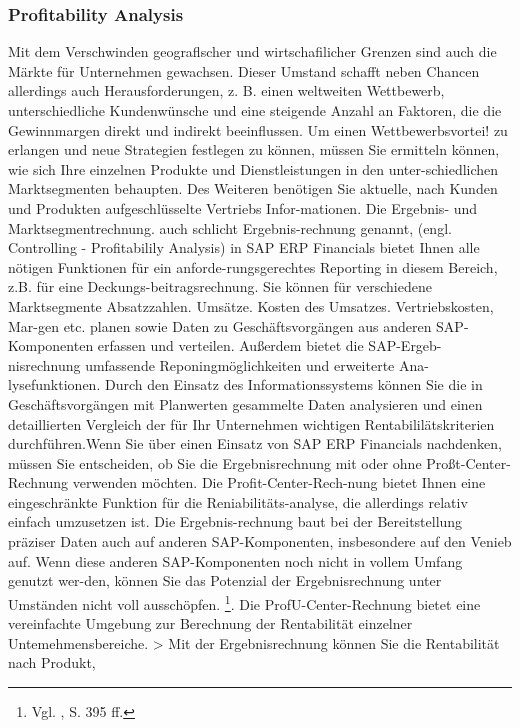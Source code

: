 \subsubsection{Profitability Analysis} %
Mit dem Verschwinden geograflscher und wirtschafilicher Grenzen
sind auch die Märkte für Unternehmen gewachsen. Dieser Umstand
schafft neben Chancen allerdings auch Herausforderungen, z. B. einen
weltweiten Wettbewerb, unterschiedliche Kundenwünsche und eine
steigende Anzahl an Faktoren, die die Gewinnmargen direkt und
indirekt beeinflussen. Um einen Wettbewerbsvortei! zu erlangen und
neue Strategien festlegen zu können, müssen Sie ermitteln können,
wie sich Ihre einzelnen Produkte und Dienstleistungen in den unter-schiedlichen Marktsegmenten behaupten. Des Weiteren benötigen Sie
aktuelle, nach Kunden und Produkten aufgeschlüsselte Vertriebs Infor-mationen. Die Ergebnis- und Marktsegmentrechnung. auch schlicht Ergebnis-rechnung genannt, (engl. Controlling - Profitabilily Analysis) in SAP
ERP Financials bietet Ihnen alle nötigen Funktionen für ein anforde-rungsgerechtes Reporting in diesem Bereich, z.B. für eine Deckungs-beitragsrechnung. Sie können für verschiedene Marktsegmente
Absatzzahlen. Umsätze. Kosten des Umsatzes. Vertriebskosten, Mar-gen etc. planen sowie Daten zu Geschäftsvorgängen aus anderen SAP-Komponenten erfassen und verteilen. Außerdem bietet die SAP-Ergeb-nisrechnung umfassende Reponingmöglichkeiten und erweiterte Ana-lysefunktionen. Durch den Einsatz des Informationssystems können Sie die in
Geschäftsvorgängen mit Planwerten gesammelte Daten analysieren
und einen detaillierten Vergleich der für Ihr Unternehmen wichtigen
Rentabililätskriterien durchführen.Wenn Sie über einen Einsatz von SAP ERP Financials nachdenken,
müssen Sie entscheiden, ob Sie die Ergebnisrechnung mit oder ohne
Proßt-Center-Rechnung verwenden möchten. Die Profit-Center-Rech-nung bietet Ihnen eine eingeschränkte Funktion für die Reniabilitäts-analyse, die allerdings relativ einfach umzusetzen ist. Die Ergebnis-rechnung baut bei der Bereitstellung präziser Daten auch auf anderen
SAP-Komponenten, insbesondere auf den Venieb auf. Wenn diese
anderen SAP-Komponenten noch nicht in vollem Umfang genutzt wer-den, können Sie das Potenzial der Ergebnisrechnung unter Umständen
nicht voll ausschöpfen. \footnote{Vgl. \cite{Patel2009}, S. 395 ff.}. 
Die ProfU-Center-Rechnung bietet eine vereinfachte Umgebung zur
Berechnung der Rentabilität einzelner Untemehmensbereiche.
> Mit der Ergebnisrechnung können Sie die Rentabilität nach Produkt,
